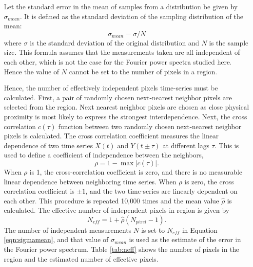 \documentclass{aastex}
\newcommand{\PS}{power spectrum}
\newcommand{\Fps}{Fourier \PS}
\begin{document}
Let the standard error in the mean of samples from a distribution be
given by $\sigma_{mean}$.  It is defined as the standard deviation of
the sampling distribution of the mean:
\begin{equation}
\sigma_{mean} = \sigma / N
\label{eqn:sigmamean}
\end{equation}
where $\sigma$ is the standard deviation of the original distribution
and $N$ is the sample size.  This formula assumes that the
measurements taken are all independent of each other, which is not the
case for the Fourier power spectra studied here.  Hence the value of
$N$ cannot be set to the number of pixels in a region.

Hence, the number of effectively independent pixels time-series must
be calculated.  First, a pair of randomly chosen next-nearest neighbor
pixels are selected from the region.  Next nearest neighbor pixels are
chosen as close physical proximity is most likely to express the
strongest interdependence.  Next, the cross correlation $c(\tau)$
function between two randomly chosen next-nearest neighbor pixels is
calculated.  The cross correlation coefficient measures the linear
dependence of two time series $X(t)$ and $Y(t \pm \tau)$ at different
lags $\tau$.  This is used to define a coefficient of independence
between the neighbors,
\begin{equation}
\label{eqn:ind}
\rho = 1 - \max|c(\tau)|.
\end{equation}
When $\rho$ is 1, the cross-correlation coefficient is zero, and there
is no measurable linear dependence between neighboring time series.
When $\rho$ is zero, the cross correlation coefficient is $\pm 1$, and
the two time-series are linearly dependent on each other.  This
procedure is repeated 10,000 times and the mean value $\hat{\rho}$ is
calculated. The effective number of independent pixels in region is
given by
\begin{equation}
\label{eqn:nind}
N_{eff}= 1 + \hat{\rho}(N_{pixel}-1).
\end{equation}
The number of independent measurements $N$ is set to $N_{eff}$ in
Equation \ref{eqn:sigmamean}, and that value of $\sigma_{mean}$ is
used as the estimate of the error in the \Fps.  Table \ref{tab:neff}
shows the number of pixels in the region and the estimated number of
effective pixels.
\end{document}
